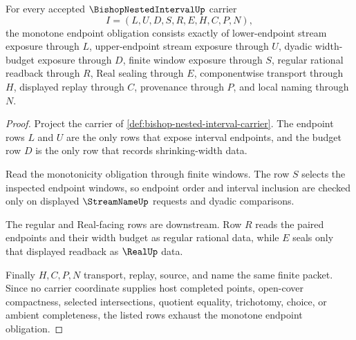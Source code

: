 \begin{theorem}
\label{thm:bishop-nested-interval-monotone-endpoint-obligation}
For every accepted $\BishopNestedIntervalUp$ carrier
$$
I=(L,U,D,S,R,E,H,C,P,N),
$$
the monotone endpoint obligation consists exactly of lower-endpoint stream exposure through $L$, upper-endpoint stream exposure through $U$, dyadic width-budget exposure through $D$, finite window exposure through $S$, regular rational readback through $R$, Real sealing through $E$, componentwise transport through $H$, displayed replay through $C$, provenance through $P$, and local naming through $N$.
\end{theorem}
\begin{proof}
Project the carrier of \autoref{def:bishop-nested-interval-carrier}. The endpoint rows $L$ and $U$ are the only rows that expose interval endpoints, and the budget row $D$ is the only row that records shrinking-width data.

Read the monotonicity obligation through finite windows. The row $S$ selects the inspected endpoint windows, so endpoint order and interval inclusion are checked only on displayed $\StreamNameUp$ requests and dyadic comparisons.

The regular and Real-facing rows are downstream. Row $R$ reads the paired endpoints and their width budget as regular rational data, while $E$ seals only that displayed readback as $\RealUp$ data.

Finally $H,C,P,N$ transport, replay, source, and name the same finite packet. Since no carrier coordinate supplies host completed points, open-cover compactness, selected intersections, quotient equality, trichotomy, choice, or ambient completeness, the listed rows exhaust the monotone endpoint obligation.
\end{proof}

